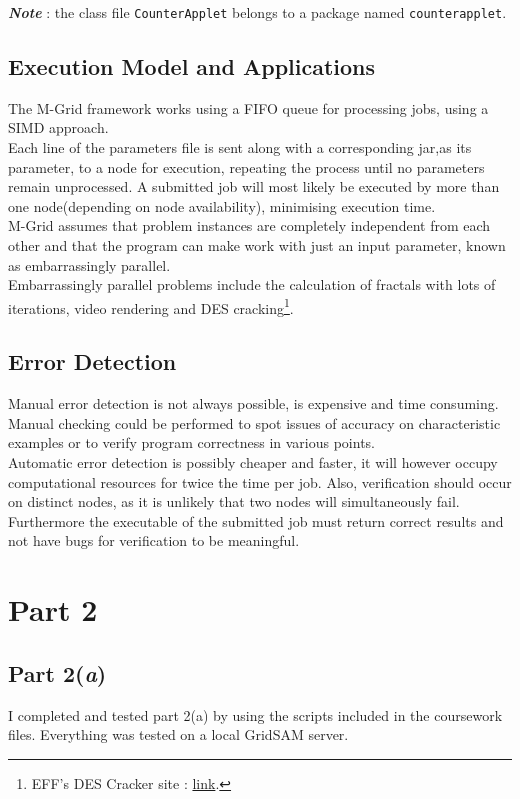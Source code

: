 \documentclass[12pt,a4paper,onecolumn]{article}
\begin{document}
\textbf{\textit{Note}} : the class file \texttt{CounterApplet} belongs to a package named \texttt{counterapplet}.

\subsection{Execution Model and Applications}
The M-Grid framework works using a FIFO queue for processing jobs, using a SIMD approach.\\

Each line of the parameters file is sent along with a corresponding jar,as its parameter, to a node for execution, repeating the process until no parameters remain unprocessed. A submitted job will most likely be executed by more than one node(depending on node availability), minimising execution time.\\

M-Grid assumes that problem instances are completely independent from each other and that the program can make work with just an input parameter, known as embarrassingly parallel.\\

Embarrassingly parallel problems include the calculation of fractals with lots of iterations, video rendering and DES cracking\footnote{EFF's DES Cracker site : \href{http://w2.eff.org/Privacy/Crypto/Crypto_misc/DESCracker/HTML/19980716_eff_des_faq.html}{link}.}.

\subsection{Error Detection}
Manual error detection is not always possible, is expensive and time consuming. Manual checking could be performed to spot issues of accuracy on characteristic examples or to verify program correctness in various points.\\

Automatic error detection is possibly cheaper and faster, it will however occupy computational resources for twice the time per job. Also, verification should occur on distinct nodes, as it is unlikely that two nodes will simultaneously fail. Furthermore the executable of the submitted job must return correct results and not have bugs for verification to be meaningful.

\section{Part 2}
\subsection{Part 2(\textit{a})}
I completed and tested part 2(a) by using the scripts included in the coursework files. Everything was tested on a local GridSAM server.
\end{document}
